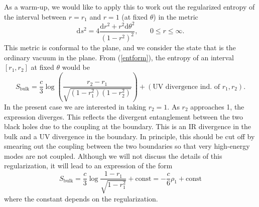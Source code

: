 \documentclass[11pt]{article}
\newcommand{\be}{\begin{equation}}
\newcommand{\ee}{\end{equation}}
\numberwithin{equation}{section}
\begin{document}
As a warm-up, we would like to apply this to work out the regularized entropy of the interval between $r = r_1$ and $r = 1$ (at fixed $\theta$) in the metric
\be
\mathrm{d}s^2 = 4\frac{\mathrm{d}r^2 + r^2\mathrm{d}\theta^2}{(1-r^2)^2}, \hspace{20pt} 0\le r \le \infty.
\ee
This metric is conformal to the plane, and we consider the state that is the ordinary vacuum in the plane. From (\ref{entform}), the entropy of an interval $[r_1,r_2]$ at fixed $\theta$ would be
\be
S_{\text{bulk}} = \frac{c}{3}\log\left(\frac{r_2-r_1}{\sqrt{(1-r_1^2)(1-r_2^2)}}\right) + (\text{UV divergence ind. of $r_1,r_2$}).
\ee
In the present case we are interested in taking $r_2 = 1$. As $r_2$ approaches 1, the expression diverges. This reflects the divergent entanglement between the two black holes due to the coupling at the boundary. This is an IR divergence in the bulk and a UV divergence in the boundary. In principle, this should be cut off by smearing out the coupling between the two boundaries so that very high-energy modes are not coupled. Although we will not discuss the details of this regularization, it will lead to an expression of the form
\be
S_{\text{bulk}} = \frac{c}{3}\log\frac{1-r_1}{\sqrt{1-r_1^2}} + \text{const} = -\frac{c}{6}\rho_1 + \text{const}
\ee
where the constant depends on the regularization.
\end{document}
